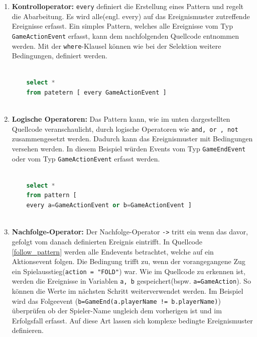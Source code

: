 \begin{enumerate}
	\item \textbf{Kontrolloperator:} \texttt{every} definiert die Erstellung eines Pattern und regelt die Abarbeitung. Es wird alle(engl. every) auf das Ereignismuster zutreffende Ereignisse erfasst. Ein simples Pattern, welches alle Ereignisse vom Typ \texttt{GameActionEvent} erfasst, kann dem nachfolgenden Quellcode entnommen werden.
	Mit der \texttt{where}-Klausel können wie bei der Selektion weitere Bedingungen, definiert werden.
	
	\begin{lstlisting}[caption={Einfaches Pattern mit Where-Klausel},label=basic_pattern, captionpos=b,language=SQL]

	select *
	from patetern [ every GameActionEvent ]
	
	\end{lstlisting}
	
	\item \textbf{Logische Operatoren:} 
	Das Pattern kann, wie im unten dargestellten Quellcode veranschaulicht, durch logische Operatoren wie \texttt{and, or , not} zusammengesetzt werden. Dadurch kann das Ereignismuster mit Bedingungen versehen werden. In diesem Beispiel würden Events vom Typ \texttt{GameEndEvent} oder vom Typ \texttt{GameActionEvent} erfasst werden.
	
	\begin{lstlisting}[caption={Pattern mit logischen Operatoren},label=logic_pattern,captionpos=b,language=SQL]
	
	select *
	from pattern [
	every a=GameActionEvent or b=GameActionEvent ]
	
	\end{lstlisting}
	
	\item \textbf{Nachfolge-Operator:}
	Der Nachfolge-Operator \texttt{->} tritt ein wenn das davor, gefolgt vom danach definierten Ereignis eintrifft. In Quellcode \ref{follow_pattern}  werden alle Endevents betrachtet, welche auf ein Aktionsevent folgen. Die Bedingung trifft zu, wenn der vorangegangene Zug ein Spielausstieg(\texttt{action = "FOLD"}) war.
	Wie im Quellcode zu erkennen ist, werden die Ereignisse in Variablen \texttt{a, b} gespeichert(bspw. \texttt{a=GameAction}). So können die Werte im nächsten Schritt weiterverwendet werden. Im Beispiel wird das Folgeevent (\texttt{b=GameEnd(a.playerName != b.playerName)}) überprüfen ob der Spieler-Name ungleich dem vorherigen ist und im Erfolgsfall erfasst. Auf diese Art lassen sich komplexe bedingte Ereignismuster definieren.
	

\end{enumerate}
